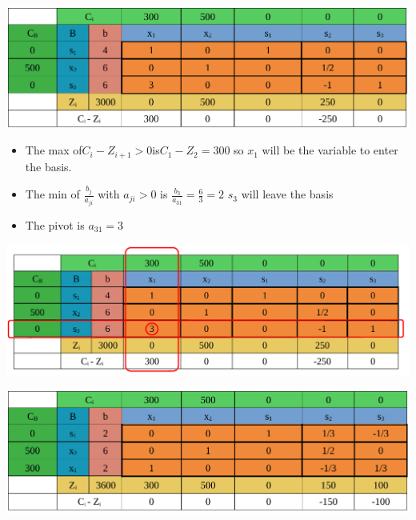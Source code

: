 \begin{center}
    \includegraphics{Chapters/Simplexe/EX/EX1/ex1.3.pdf}
\end{center}

\vspace{0.25cm}
\begin{itemize}   
    \item The max of\hspace{0.2cm}\(C_i - Z_{i+1} > 0\)\hspace{0.2cm}is\hspace{0.2cm}\(C_1 - Z_2 = 300\)\hspace{0.1cm} so \(x_1\) 
will be the variable to enter the basis.
\item The min of \hspace{0.1cm}\(\frac{b_j}{a_{ji}}\)\hspace{0.1cm} with \(a_{ji} > 0\)\hspace{0.1cm} is \hspace{0.1cm} \(\frac{b_3}{a_{31}} = \frac{6}{3} = 2\)\hspace{0.35cm} \(s_3\)
will leave the basis
\item The pivot is \(a_{31} = 3\)
 
\end{itemize}

\vspace{0.25cm}

\begin{center}
    \includegraphics{Chapters/Simplexe/EX/EX1/ex1.4.pdf}
\end{center}

\newpage
\begin{center}
    \includegraphics{Chapters/Simplexe/EX/EX1/ex1.5.pdf}
\end{center}

